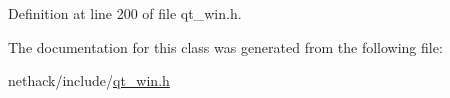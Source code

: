 Definition at line 200 of file qt\+\_\+win.\+h.



The documentation for this class was generated from the following file\+:\begin{DoxyCompactItemize}
\item 
nethack/include/\hyperlink{qt__win_8h}{qt\+\_\+win.\+h}\end{DoxyCompactItemize}
